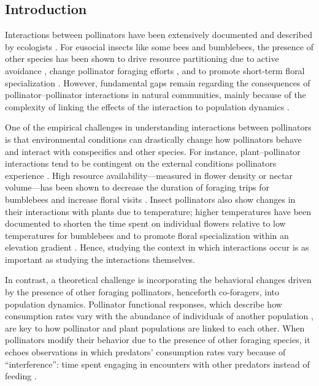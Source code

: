 \begin{refsection}
\section*{Introduction}
Interactions between pollinators have been extensively documented and described by ecologists \citep{mallinger2017managed, thomson_importance_2020}. For eusocial insects like some bees and bumblebees, the presence of other species has been shown to drive resource partitioning due to active avoidance \citep{morse_resource_1977, inouye_resource_1978}, change pollinator foraging efforts  \citep{thomson_detecting_2006}, and to promote short-term floral specialization \citep{brosi_single_2013, briggs_competitive_2016}. However, fundamental gaps remain regarding the consequences of pollinator--pollinator interactions in natural communities, mainly because of the complexity of linking the effects of the interaction to population dynamics \citep{thomson_importance_2020}.


One of the empirical challenges in understanding interactions between pollinators is that environmental conditions can drastically change how pollinators behave and interact with conspecifics and other species. For instance, plant--pollinator interactions tend to be contingent on the external conditions pollinators experience \citep{heinrich_resource_1976,cnaani_flower_2006,briggs_variation_2018}. High resource availability---measured in flower density or nectar volume---has been shown to decrease the duration of foraging trips for bumblebees \citep{westphal_foraging_2006} and increase floral visits \citep{thomson_response_1987, thomson_effects_1988}. Insect pollinators also show changes in their interactions with plants due to temperature; higher temperatures have been documented to shorten the time spent on individual flowers relative to low temperatures for bumblebees \citep{heinrich_energetics_1972} and to promote floral specialization within an elevation gradient \citep{classen2020specialization}. Hence, studying the context in which interactions occur is as important as studying the interactions themselves.


In contrast, a theoretical challenge is incorporating the behavioral changes driven by the presence of other foraging pollinators, henceforth co-foragers, into population dynamics. Pollinator functional responses, which describe how consumption rates vary with the abundance of individuals of another population \citep{holland_population_2001}, are key to how pollinator and plant populations are linked to each other. When pollinators modify their behavior due to the presence of other foraging species, it echoes observations in which predators' consumption rates vary because of ``interference'': time spent engaging in encounters with other predators instead of feeding \citep{beddington_mutual_1975,deangelis_emergence_2006,skalski_functional_2001}.


\end{refsection}
